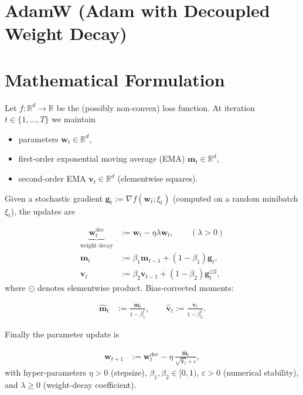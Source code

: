 \documentclass{article}
\begin{document}
\section*{AdamW (Adam with Decoupled Weight Decay)}

\section*{Mathematical Formulation}
Let $f:\mathbb{R}^{d}\to\mathbb{R}$ be the (possibly non‑convex) loss function.  
At iteration $t\in\{1,\dots,T\}$ we maintain

\begin{itemize}
    \item parameters $\bm w_t\in\mathbb{R}^{d}$,
    \item first‑order exponential moving average (EMA) $\bm m_t\in\mathbb{R}^{d}$,
    \item second‑order EMA $\bm v_t\in\mathbb{R}^{d}$ (elementwise squares).
\end{itemize}

Given a stochastic gradient $\bm g_t:=\nabla f(\bm w_t;\xi_t)$ (computed on a random minibatch $\xi_t$), the updates are

\begin{align}
    \underbrace{\bm w_t^{\text{dec}}}_{\text{weight decay}} &:= \bm w_t - \eta\lambda \bm w_t, \qquad (\lambda>0) \tag{1}\\[4pt]
    \bm m_t &:= \beta_1 \bm m_{t-1} + (1-\beta_1)\bm g_t, \tag{2}\\[4pt]
    \bm v_t &:= \beta_2 \bm v_{t-1} + (1-\beta_2)\bm g_t^{\odot 2}, \tag{3}
\end{align}
where $\odot$ denotes elementwise product.  
Bias‑corrected moments:

\begin{align}
    \hat{\bm m}_t &:= \frac{\bm m_t}{1-\beta_1^{t}}, \qquad
    \hat{\bm v}_t := \frac{\bm v_t}{1-\beta_2^{t}}. \tag{4}
\end{align}

Finally the parameter update is

\begin{align}
    \bm w_{t+1} &:= \bm w_t^{\text{dec}} - \eta\,
    \frac{\hat{\bm m}_t}{\sqrt{\hat{\bm v}_t}+\varepsilon}, \tag{5}
\end{align}
with hyper‑parameters
$\eta>0$ (stepsize), $\beta_1,\beta_2\in[0,1)$, $\varepsilon>0$ (numerical stability), and $\lambda\ge 0$ (weight‑decay coefficient).
\end{document}
